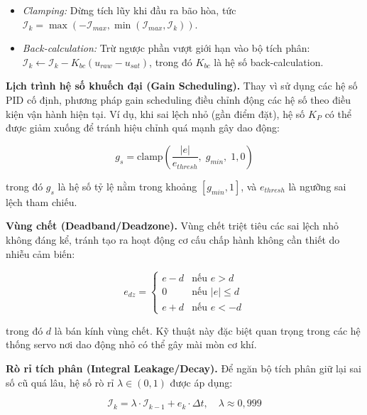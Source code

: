 \begin{itemize}
    \item \textit{Clamping:} Dừng tích lũy khi đầu ra bão hòa, tức $\mathcal{I}_{k} = \max(-\mathcal{I}_{max}, \min(\mathcal{I}_{max}, \mathcal{I}_{k}))$.
    \item \textit{Back-calculation:} Trừ ngược phần vượt giới hạn vào bộ tích phân: $\mathcal{I}_{k} \leftarrow \mathcal{I}_{k} - K_{bc}(u_{raw} - u_{sat})$, trong đó $K_{bc}$ là hệ số back-calculation.
\end{itemize}

\textbf{Lịch trình hệ số khuếch đại (Gain Scheduling).}
Thay vì sử dụng các hệ số PID cố định, phương pháp gain scheduling điều chỉnh động các hệ số theo điều kiện vận hành hiện tại. Ví dụ, khi sai lệch nhỏ (gần điểm đặt), hệ số $K_P$ có thể được giảm xuống để tránh hiệu chỉnh quá mạnh gây dao động:

\begin{equation}
    g_s = \text{clamp}\left(\frac{|e|}{e_{thresh}},\; g_{min},\; 1{,}0\right)
\end{equation}

trong đó $g_s$ là hệ số tỷ lệ nằm trong khoảng $[g_{min}, 1]$, và $e_{thresh}$ là ngưỡng sai lệch tham chiếu.

\textbf{Vùng chết (Deadband/Deadzone).}
Vùng chết triệt tiêu các sai lệch nhỏ không đáng kể, tránh tạo ra hoạt động cơ cấu chấp hành không cần thiết do nhiễu cảm biến:

\begin{equation}
    e_{dz} = \begin{cases}
        e - d & \text{nếu } e > d \\
        0 & \text{nếu } |e| \leq d \\
        e + d & \text{nếu } e < -d
    \end{cases}
\end{equation}

trong đó $d$ là bán kính vùng chết. Kỹ thuật này đặc biệt quan trọng trong các hệ thống servo nơi dao động nhỏ có thể gây mài mòn cơ khí.

\textbf{Rò rỉ tích phân (Integral Leakage/Decay).}
Để ngăn bộ tích phân giữ lại sai số cũ quá lâu, hệ số rò rỉ $\lambda \in (0, 1)$ được áp dụng:

\begin{equation}
    \mathcal{I}_k = \lambda \cdot \mathcal{I}_{k-1} + e_k \cdot \Delta t, \quad \lambda \approx 0{,}999
\end{equation}

